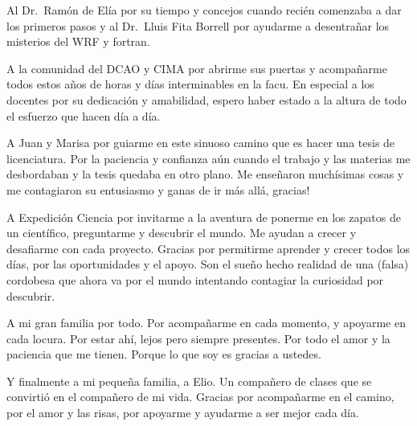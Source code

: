 \documentclass[12pt,spanish,oneside, a4paper]{book}
\begin{document}
Al Dr.~Ramón de Elía por su tiempo y concejos cuando recién comenzaba a
dar los primeros pasos y al Dr.~Lluis Fita Borrell por ayudarme a
desentrañar los misterios del WRF y fortran.

A la comunidad del DCAO y CIMA por abrirme sus puertas y acompañarme
todos estos años de horas y días interminables en la facu. En especial a
los docentes por su dedicación y amabilidad, espero haber estado a la
altura de todo el esfuerzo que hacen día a día.

A Juan y Marisa por guiarme en este sinuoso camino que es hacer una
tesis de licenciatura. Por la paciencia y confianza aún cuando el
trabajo y las materias me desbordaban y la tesis quedaba en otro plano.
Me enseñaron muchísimas cosas y me contagiaron su entusiasmo y ganas de
ir más allá, gracias!

A Expedición Ciencia por invitarme a la aventura de ponerme en los
zapatos de un científico, preguntarme y descubrir el mundo. Me ayudan a
crecer y desafiarme con cada proyecto. Gracias por permitirme aprender y
crecer todos los días, por las oportunidades y el apoyo. Son el sueño
hecho realidad de una (falsa) cordobesa que ahora va por el mundo
intentando contagiar la curiosidad por descubrir.

A mi gran familia por todo. Por acompañarme en cada momento, y apoyarme
en cada locura. Por estar ahí, lejos pero siempre presentes. Por todo el
amor y la paciencia que me tienen. Porque lo que soy es gracias a
ustedes.

Y finalmente a mi pequeña familia, a Elio. Un compañero de clases que se
convirtió en el compañero de mi vida. Gracias por acompañarme en el
camino, por el amor y las risas, por apoyarme y ayudarme a ser mejor
cada día.

\newpage
\end{document}
